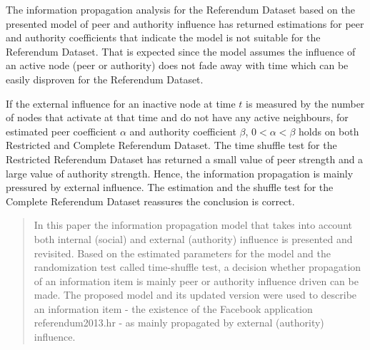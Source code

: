 \documentclass[times, utf8, zavrsni]{fer}
\begin{document}
The information propagation analysis for the Referendum Dataset based on the presented model of peer and authority influence has returned estimations for peer and authority coefficients that indicate the model is not suitable for the Referendum Dataset. That is expected since the model assumes the influence of an active node (peer or authority) does not fade away with time which can be easily disproven for the Referendum Dataset.

If the external influence for an inactive node at time $t$ is measured by the number of nodes that activate at that  time and do not have any active neighbours, for estimated peer coefficient $\alpha$ and authority coefficient $\beta$, $0 < \alpha < \beta$ holds on both Restricted and Complete Referendum Dataset. The time shuffle test for the Restricted Referendum Dataset has returned a small value of peer strength and a large value of authority strength. Hence, the information propagation is mainly pressured by external influence. The estimation and the shuffle test for the Complete Referendum Dataset reassures the conclusion is correct. 



\pagebreak
{}
\begin{abstract}
In this paper the information propagation model that takes into account both internal (social) and external (authority) influence is presented and revisited. Based on the estimated parameters for the model and the randomization test called time-shuffle test, a decision whether propagation of an information item is mainly peer or authority influence driven can be made. The proposed model and its updated version were used to describe an information item - the existence of the Facebook application referendum2013.hr - as mainly propagated by external (authority) influence. 

\end{abstract}
\end{document}
